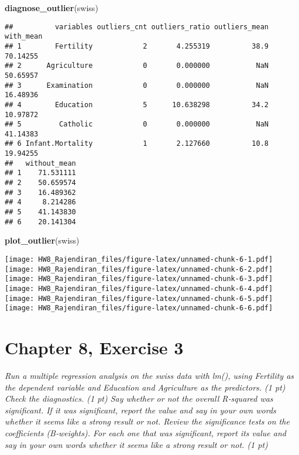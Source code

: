 \documentclass[]{article}
\newenvironment{Shaded}{\begin{snugshade}}{\end{snugshade}}
\newcommand{\KeywordTok}[1]{\textcolor[rgb]{0.13,0.29,0.53}{\textbf{#1}}}
\newcommand{\NormalTok}[1]{#1}
\begin{document}
\begin{Shaded}
\begin{Highlighting}[]
\KeywordTok{diagnose_outlier}\NormalTok{(swiss)}
\end{Highlighting}
\end{Shaded}

\begin{verbatim}
##          variables outliers_cnt outliers_ratio outliers_mean with_mean
## 1        Fertility            2       4.255319          38.9  70.14255
## 2      Agriculture            0       0.000000           NaN  50.65957
## 3      Examination            0       0.000000           NaN  16.48936
## 4        Education            5      10.638298          34.2  10.97872
## 5         Catholic            0       0.000000           NaN  41.14383
## 6 Infant.Mortality            1       2.127660          10.8  19.94255
##   without_mean
## 1    71.531111
## 2    50.659574
## 3    16.489362
## 4     8.214286
## 5    41.143830
## 6    20.141304
\end{verbatim}

\begin{Shaded}
\begin{Highlighting}[]
\KeywordTok{plot_outlier}\NormalTok{(swiss)}
\end{Highlighting}
\end{Shaded}

\texttt{[image: HW8\_Rajendiran\_files/figure-latex/unnamed-chunk-6-1.pdf]}
\texttt{[image: HW8\_Rajendiran\_files/figure-latex/unnamed-chunk-6-2.pdf]}
\texttt{[image: HW8\_Rajendiran\_files/figure-latex/unnamed-chunk-6-3.pdf]}
\texttt{[image: HW8\_Rajendiran\_files/figure-latex/unnamed-chunk-6-4.pdf]}
\texttt{[image: HW8\_Rajendiran\_files/figure-latex/unnamed-chunk-6-5.pdf]}
\texttt{[image: HW8\_Rajendiran\_files/figure-latex/unnamed-chunk-6-6.pdf]}

\hypertarget{chapter-8-exercise-3}{%
\section{Chapter 8, Exercise 3}\label{chapter-8-exercise-3}}

\emph{Run a multiple regression analysis on the swiss data with lm(),
using Fertility as the dependent variable and Education and Agriculture
as the predictors. (1 pt) Check the diagnostics. (1 pt) Say whether or
not the overall R‐squared was significant. If it was significant, report
the value and say in your own words whether it seems like a strong
result or not. Review the significance tests on the coefficients
(B‐weights). For each one that was significant, report its value and say
in your own words whether it seems like a strong result or not. (1 pt)}
\end{document}
